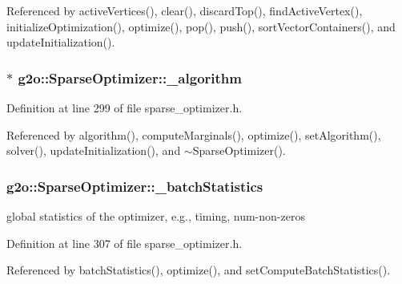 Referenced by active\+Vertices(), clear(), discard\+Top(), find\+Active\+Vertex(), initialize\+Optimization(), optimize(), pop(), push(), sort\+Vector\+Containers(), and update\+Initialization().

\subsubsection[{\texorpdfstring{\+\_\+algorithm}{_algorithm}}]{$\ast$ g2o\+::\+Sparse\+Optimizer\+::\+\_\+algorithm\hspace{0.3cm}{\ttfamily [protected]}}\hypertarget{classg2o_1_1SparseOptimizer_a665d4ba54db76a1174bfc85a6dbc5127}{}\label{classg2o_1_1SparseOptimizer_a665d4ba54db76a1174bfc85a6dbc5127}


Definition at line 299 of file sparse\+\_\+optimizer.\+h.



Referenced by algorithm(), compute\+Marginals(), optimize(), set\+Algorithm(), solver(), update\+Initialization(), and $\sim$\+Sparse\+Optimizer().

\subsubsection[{\texorpdfstring{\+\_\+batch\+Statistics}{_batchStatistics}}]{ g2o\+::\+Sparse\+Optimizer\+::\+\_\+batch\+Statistics\hspace{0.3cm}{\ttfamily [protected]}}\hypertarget{classg2o_1_1SparseOptimizer_a21215378d9e8de28aee8d55b4d25ff89}{}\label{classg2o_1_1SparseOptimizer_a21215378d9e8de28aee8d55b4d25ff89}


global statistics of the optimizer, e.\+g., timing, num-\/non-\/zeros 



Definition at line 307 of file sparse\+\_\+optimizer.\+h.



Referenced by batch\+Statistics(), optimize(), and set\+Compute\+Batch\+Statistics().

